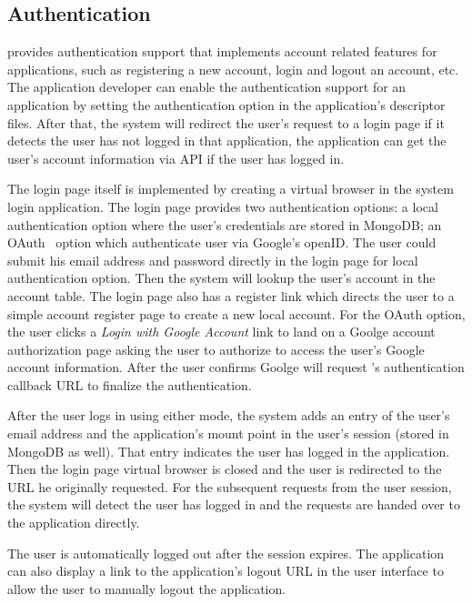 \subsection{Authentication}

\cb provides authentication support that implements account related features
for applications,
such as registering a new account, login and logout an account, etc.
The application developer can enable the authentication support for an
application by setting the authentication option in the application's descriptor
files.
After that,
the system will redirect the user's request to a login page if it detects the
user has not logged in that application,
the application can get the user's account information via \cb API if the user
has logged in.

The login page itself is implemented by creating a virtual
browser in the system login application. The login page provides two
authentication options: a local authentication option where the user's
credentials are stored in MongoDB; an OAuth~\cite{hardt2012oauth} option which
authenticate user via Google's openID. The user could submit his email address
and password directly in the login page for local authentication option. Then
the system will lookup the user's account in the account table.
The login page also has a register link which directs the user to a simple
account register page to create a new local account.
For the OAuth
option, the user clicks a \emph{Login with Google Account} link to land on a
Goolge account authorization page asking the user to authorize \cb{} to access
the user's Google account information.
After the user confirms Goolge will request \cb{}'s authentication
callback URL to finalize the authentication.

After the user logs in using either mode, the system adds an entry of the
user's email address and the application's mount point in the user's session
(stored in MongoDB as well). That entry indicates the user has logged in the
application. Then the login page virtual browser is closed and the user is
redirected to  the URL he originally requested. 
For the subsequent requests from the user session,
the system will detect the user has logged in and the requests are handed over
to the application directly.

The user is automatically logged out after the session expires.
The application can also display a link to the application's logout URL 
 in the user interface to allow the user to manually logout the application.


